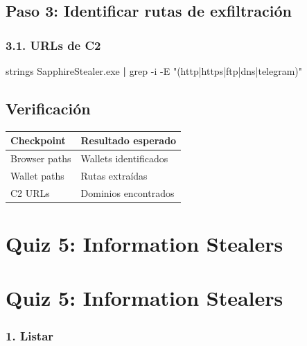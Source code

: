\documentclass[
  letterpaper,
]{report}
\newenvironment{Shaded}{\begin{snugshade}}{\end{snugshade}}
\newcommand{\AttributeTok}[1]{\textcolor[rgb]{0.40,0.45,0.13}{#1}}
\newcommand{\FunctionTok}[1]{\textcolor[rgb]{0.28,0.35,0.67}{#1}}
\newcommand{\KeywordTok}[1]{\textcolor[rgb]{0.00,0.23,0.31}{\textbf{#1}}}
\newcommand{\NormalTok}[1]{\textcolor[rgb]{0.00,0.23,0.31}{#1}}
\newcommand{\StringTok}[1]{\textcolor[rgb]{0.13,0.47,0.30}{#1}}
\newcounter{none} %
\begin{document}
\section{Paso 3: Identificar rutas de
exfiltración}\label{paso-3-identificar-rutas-de-exfiltraciuxf3n}

\subsection{3.1. URLs de C2}\label{urls-de-c2}

\begin{Shaded}
\begin{Highlighting}[]
\FunctionTok{strings}\NormalTok{ SapphireStealer.exe }\KeywordTok{|} \FunctionTok{grep} \AttributeTok{{-}i} \AttributeTok{{-}E} \StringTok{"(http|https|ftp|dns|telegram)"}
\end{Highlighting}
\end{Shaded}

\section{Verificación}\label{verificaciuxf3n-3}

{\def\LTcaptype{none} %
\begin{longtable}[]{@{}ll@{}}
\toprule\noalign{}
Checkpoint & Resultado esperado \\
\midrule\noalign{}
\endhead
\bottomrule\noalign{}
\endlastfoot
Browser paths & Wallets identificados \\
Wallet paths & Rutas extraídas \\
C2 URLs & Dominios encontrados \\
\end{longtable}
}

\chapter{Quiz 5: Information
Stealers}\label{quiz-5-information-stealers}

\chapter{Quiz 5: Information
Stealers}\label{quiz-5-information-stealers-1}

\subsection{1. Listar}\label{listar}
\end{document}
